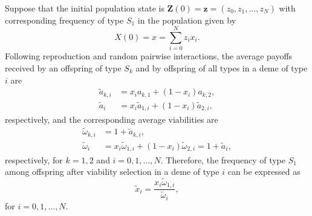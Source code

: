 \documentclass[11pt]{article}
\begin{document}
Suppose that the initial population state is $\mathbf{Z}(0)=\mathbf{z}=(z_0,z_1,\ldots,z_N)$ with corresponding frequency of type $S_1$ in the population given by
\begin{equation}\label{sec1-eq7}
X(0)=x=\sum_{i=0}^{N}z_ix_i.
\end{equation} 
Following reproduction and random pairwise interactions, the  average payoffs received by an offspring of type $S_k$ and by offspring of all types in a deme of type $i$ are 
 \begin{subequations}\label{sec1-eq9}
 \begin{align}
\tilde{a}_{k,i}&=x_ia_{k,1}+\left(1-x_i\right)a_{k,2},\\
\tilde{a}_{i}&=x_i\tilde{a}_{1,i}+\left(1-x_i\right)\tilde{a}_{2,i},
\end{align}
\end{subequations}
respectively, and the corresponding average viabilities are
\begin{subequations}\label{sec1-eq10}
 \begin{align}
\tilde{\omega}_{k,i}&=1+\tilde{a}_{k,i},\\
\tilde{\omega}_{i}&=x_i\tilde{\omega}_{1,i}+\left(1-x_i\right)\tilde{\omega}_{2,i}=1+\tilde{a}_{i},
\end{align}
\end{subequations}
respectively, for $k=1, 2$ and $i=0,1, \ldots, N$. Therefore, the frequency
 of type $S_1$ among offspring after viability selection in a deme of type $i$ can be expressed as
\begin{equation}\label{sec1-eq11}
\tilde{x}_i=\frac{x_i\tilde{\omega}_{1,i}}{\tilde{\omega}_{i}},
\end{equation}
for $i=0,1, \ldots, N$. 
\end{document}
